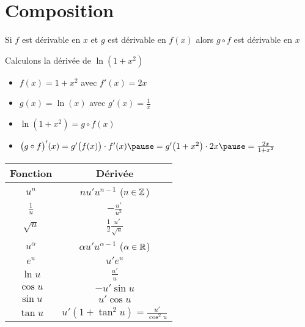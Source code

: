 

\section*{Composition}


\begin{frame}

\begin{proposition}
Si $f$ est dérivable en $x$ et $g$ est dérivable en $f(x)$ alors $g\circ f$ est
dérivable en $x$ 
\pause 
{}
\end{proposition}
\pause 

\begin{exemple}
Calculons la dérivée de $\ln(1+x^2)$
\pause 
\begin{itemize}
  \item $f(x)=1+x^2$ avec $f'(x) = 2x$
 \pause  
  \item $g(x)=\ln(x)$ avec $g'(x) = \frac 1x$
 \pause  
  \item $\ln(1+x^2)=g\circ f(x)$
 \pause  
  \item $\big( g \circ f \big)'(x) = g'\big( f(x) \big) \cdot f'(x) \pause = g'\big( 1+x^2 \big) \cdot 2x \pause = \frac{2x}{1+x^2}$
\end{itemize}
\end{exemple}

\end{frame}


\begin{frame}
\begin{center}
\begin{tabular}[t]{cc@{\vrule depth 1.2ex height 3ex width 0mm \ }} 
\textbf{Fonction}         & \textbf{Dérivée} \\ \hline
   $u^n$         & $nu'u^{n-1}$  \quad  ($n \in \mathbb{Z}$)   \\ \hline
   $\frac 1u$    & $-\frac{u'}{u^2}$              \\ \hline
   $\sqrt{u}$    & $\frac12 \frac{u'}{\sqrt{u}}$   \\ \hline
   $u^\alpha$   & $\alpha u' u^{\alpha-1}$ \quad ($\alpha\in\mathbb{R}$)  \\ \hline
   $e^u$         & $u'e^u$                        \\ \hline
   $\ln u$       & $\frac {u'}{u}$                   \\ \hline
   $\cos u$      & $-u'\sin u$                    \\ \hline
   $\sin u$      & $u'\cos u$                     \\ \hline
   $\tan u$      & $u'(1+\tan^2 u) = \frac{u'}{\cos^2 u}$        \\ \hline
\end{tabular} 
\hfill
\end{center}
\end{frame}



